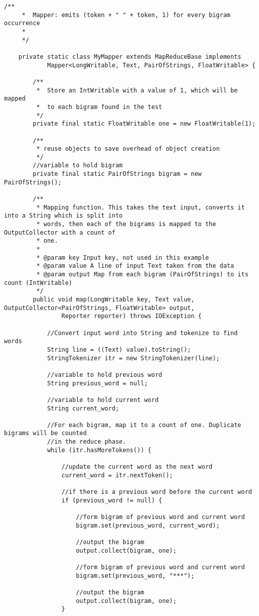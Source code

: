 \documentclass{article} %
\begin{document}
\begin{lstlisting}[style=Java]
	/**
	 *  Mapper: emits (token + " " + token, 1) for every bigram occurrence
	 *
	 */
	
	private static class MyMapper extends MapReduceBase implements
			Mapper<LongWritable, Text, PairOfStrings, FloatWritable> {

		/**
		 *  Store an IntWritable with a value of 1, which will be mapped 
		 *  to each bigram found in the test
		 */
		private final static FloatWritable one = new FloatWritable(1);
		
		/**
		 * reuse objects to save overhead of object creation
		 */
		//variable to hold bigram
		private final static PairOfStrings bigram = new PairOfStrings();

		/**
		 * Mapping function. This takes the text input, converts it into a String which is split into 
		 * words, then each of the bigrams is mapped to the OutputCollector with a count of 
		 * one. 
		 * 
		 * @param key Input key, not used in this example
		 * @param value A line of input Text taken from the data
		 * @param output Map from each bigram (PairOfStrings) to its count (IntWritable)
		 */
		public void map(LongWritable key, Text value, OutputCollector<PairOfStrings, FloatWritable> output,
				Reporter reporter) throws IOException {
			
			//Convert input word into String and tokenize to find words
			String line = ((Text) value).toString();
			StringTokenizer itr = new StringTokenizer(line);
			
			//variable to hold previous word
			String previous_word = null;
			
			//variable to hold current word
			String current_word;
			
			//For each bigram, map it to a count of one. Duplicate bigrams will be counted 
			//in the reduce phase.
			while (itr.hasMoreTokens()) {
				
				//update the current word as the next word
				current_word = itr.nextToken();
				
				//if there is a previous word before the current word
				if (previous_word != null) {
					
					//form bigram of previous word and current word
					bigram.set(previous_word, current_word);
					
					//output the bigram
					output.collect(bigram, one);
					
					//form bigram of previous word and current word
					bigram.set(previous_word, "***");
					
					//output the bigram
					output.collect(bigram, one);
				}
				

\end{lstlisting}
\end{document}
